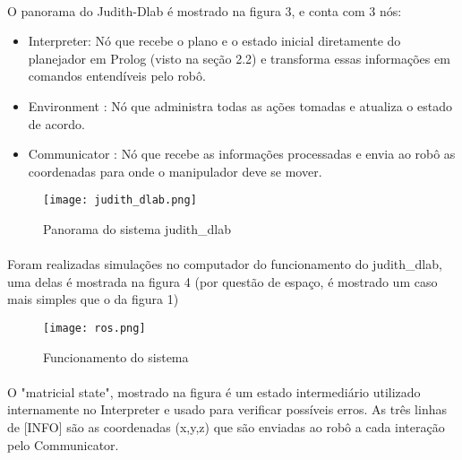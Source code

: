 \documentclass[12pt,titlepage]{article}
\begin{document}
	\paragraph{}

	O panorama do Judith-Dlab é mostrado na figura 3, e conta com 3 nós:

	\begin{itemize}
		\item Interpreter: Nó que recebe o plano e o estado inicial diretamente do planejador em Prolog (visto na seção 2.2) e transforma essas informações em comandos entendíveis pelo robô.
		\item Environment : Nó que administra todas as ações tomadas e atualiza o estado de acordo.
		\item Communicator : Nó que recebe as informações processadas e envia ao robô as coordenadas para onde o manipulador deve se mover.
	\end{itemize}

	\begin{figure}[H]
		\centering
		\texttt{[image: judith\_dlab.png]}
		\caption{Panorama do sistema judith\_dlab}
	\end{figure}

	\paragraph{}

	Foram realizadas simulações no computador do funcionamento do judith\_dlab, uma delas é mostrada na figura 4 (por questão de espaço, é mostrado um caso mais simples que o da figura 1)

	\begin{figure}[h!]
		\centering
		\texttt{[image: ros.png]}
		\caption{Funcionamento do sistema}
	\end{figure}

	\paragraph{}

	O "matricial state", mostrado na figura é um estado intermediário utilizado internamente no Interpreter e usado para verificar possíveis erros. As três linhas de [INFO] são as coordenadas (x,y,z) que são enviadas ao robô a cada interação pelo Communicator.

	\paragraph{}
\end{document}
